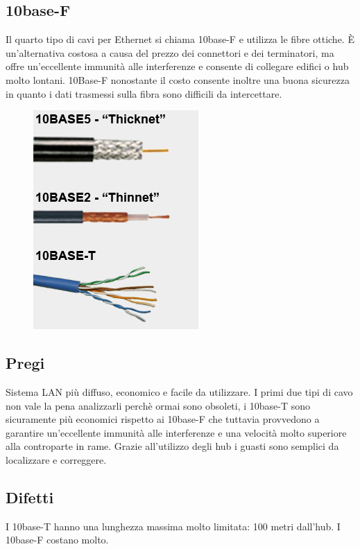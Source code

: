 \subsection{10base-F}
Il quarto tipo di cavi per Ethernet si chiama 10base-F e utilizza le fibre ottiche. È un’alternativa costosa a causa del prezzo dei connettori e dei terminatori, ma offre un’eccellente immunità alle interferenze e consente di collegare edifici o hub molto lontani. 10Base-F nonostante il costo consente inoltre una buona sicurezza in quanto i dati trasmessi sulla fibra sono difficili da intercettare.
 
\begin{figure}[H]
\centering
\includegraphics[scale=0.6]{res/img/27_CaviEthernet.png}
\end{figure}

\subsection{Pregi}
Sistema LAN più diffuso, economico e facile da utilizzare.
I primi due tipi di cavo non vale la pena analizzarli perchè ormai sono obsoleti, i 10base-T sono sicuramente più economici rispetto ai 10base-F che tuttavia provvedono a garantire un'eccellente immunità alle interferenze e una velocità molto superiore alla controparte in rame.
Grazie all'utilizzo degli hub i guasti sono semplici da localizzare e correggere.

\subsection{Difetti}
I 10base-T hanno una lunghezza massima molto limitata: 100 metri dall'hub.
I 10base-F costano molto.

